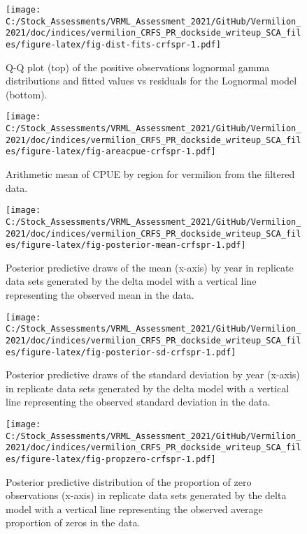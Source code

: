 \documentclass[
]{article}
\begin{document}
\FloatBarrier

\begin{figure}
\centering
\texttt{[image: C:/Stock\_Assessments/VRML\_Assessment\_2021/GitHub/Vermilion\_2021/doc/indices/vermilion\_CRFS\_PR\_dockside\_writeup\_SCA\_files/figure-latex/fig-dist-fits-crfspr-1.pdf]}
\caption{\label{fig:fig-dist-fits-crfspr}Q-Q plot (top) of the positive observations lognormal gamma distributions and fitted values vs residuals for the Lognormal model (bottom).}
\end{figure}

\begin{figure}
\centering
\texttt{[image: C:/Stock\_Assessments/VRML\_Assessment\_2021/GitHub/Vermilion\_2021/doc/indices/vermilion\_CRFS\_PR\_dockside\_writeup\_SCA\_files/figure-latex/fig-areacpue-crfspr-1.pdf]}
\caption{\label{fig:fig-areacpue-crfspr}Arithmetic mean of CPUE by region for vermilion from the filtered data.}
\end{figure}

\begin{figure}
\centering
\texttt{[image: C:/Stock\_Assessments/VRML\_Assessment\_2021/GitHub/Vermilion\_2021/doc/indices/vermilion\_CRFS\_PR\_dockside\_writeup\_SCA\_files/figure-latex/fig-posterior-mean-crfspr-1.pdf]}
\caption{\label{fig:fig-posterior-mean-crfspr}Posterior predictive draws of the mean (x-axis) by year in replicate data sets generated by the delta model with a vertical line representing the observed mean in the data.}
\end{figure}

\FloatBarrier

\begin{figure}
\centering
\texttt{[image: C:/Stock\_Assessments/VRML\_Assessment\_2021/GitHub/Vermilion\_2021/doc/indices/vermilion\_CRFS\_PR\_dockside\_writeup\_SCA\_files/figure-latex/fig-posterior-sd-crfspr-1.pdf]}
\caption{\label{fig:fig-posterior-sd-crfspr}Posterior predictive draws of the standard deviation by year (x-axis) in replicate data sets generated by the delta model with a vertical line representing the observed standard deviation in the data.}
\end{figure}

\begin{figure}
\centering
\texttt{[image: C:/Stock\_Assessments/VRML\_Assessment\_2021/GitHub/Vermilion\_2021/doc/indices/vermilion\_CRFS\_PR\_dockside\_writeup\_SCA\_files/figure-latex/fig-propzero-crfspr-1.pdf]}
\caption{\label{fig:fig-propzero-crfspr}Posterior predictive distribution of the proportion of zero observations (x-axis) in replicate data sets generated by the delta model with a vertical line representing the observed average proportion of zeros in the data.}
\end{figure}
\end{document}
